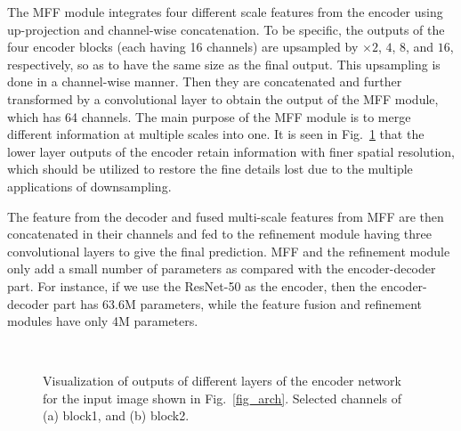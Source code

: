 \documentclass[10pt,twocolumn,letterpaper]{article}
\begin{document}
The MFF module integrates four different scale features from the encoder using up-projection and channel-wise concatenation. 
To be specific, the outputs of the four encoder blocks (each having 16 channels) are upsampled by $\times 2$, $4$, $8$, and $16$, respectively, so as to have the same size as the final output. This upsampling is done in a channel-wise manner. Then they are concatenated and further transformed by a convolutional layer to obtain the output of the MFF module, which has 64 channels. The main purpose of the MFF module is to merge different information at multiple scales into one. 
It is seen in Fig.~\ref{fig_feature} that the lower layer outputs of the encoder retain information with finer spatial resolution, which should be utilized to restore the fine details lost due to the multiple applications of downsampling. 

\begin{comment}
Figure \ref{fig_feature} shows the outputs of block1 (1/2 scale) and block2 (1/4 scale) of the encoder. It is observed that they maintain finer details of object shapes. Thus, they can be used as complementary to small scale features to recover spatial resolution. We propose MFF which integrates four different scale features.
To be specific, the outputs of the four encoder blocks are upsampled by $\times 2$, $4$, $8$, and $16$, respectively, so as to have the same size as the final output. Their outputs contain $16$ channels. Then they are further fused with a convolutional layer. Thus, the outputs of MFF have only 64 channels.
Both decoder and MFF have four up-projection modules and one convolutional layer, but they work in a different way as shown in Fig.~\ref{fig_module}.  
\end{comment}

The feature from the decoder and fused multi-scale features from MFF are then concatenated in their channels and fed to the refinement module having three convolutional layers to give the final prediction. MFF and the refinement module only add a small number of parameters as compared with the encoder-decoder part. For instance, if we use the ResNet-50 as the encoder, then the encoder-decoder part has 63.6M parameters, while the feature fusion and refinement modules have only 4M parameters. 


\begin{figure}[!t]
\centering
{}~~\caption{Visualization of outputs of different layers of the encoder network for the input image shown in Fig.~\ref{fig_arch}. Selected channels of (a)  block1, and (b) block2.}
\label{fig_feature}
\end{figure}
\end{document}
